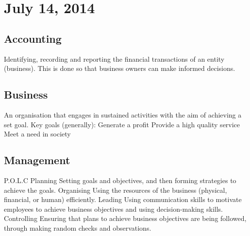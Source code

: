 \section{July 14, 2014}

\subsection{Accounting}
\begin{outline}
\1 Identifying, recording and reporting the financial transactions of an entity (business). This is done so that business owners can make informed decisions.
\end{outline}

\subsection{Business}
\begin{outline}
\1 An organisation that engages in sustained activities with the aim of achieving a set goal.
\1 Key goals (generally):
\2 Generate a profit
\2 Provide a high quality service
\2 Meet a need in society
\end{outline}

\subsection{Management}
\begin{outline}
\1 P.O.L.C
\2 Planning
\3 Setting goals and objectives, and then forming strategies to achieve the goals.
\2 Organising
\3 Using the resources of the business (physical, financial, or human) efficiently.
\2 Leading
\3 Using communication skills to motivate employees to achieve business objectives and using decision-making skills.
\2 Controlling
\3 Ensuring that plans to achieve business objectives are being followed, through making random checks and observations.
\end{outline}